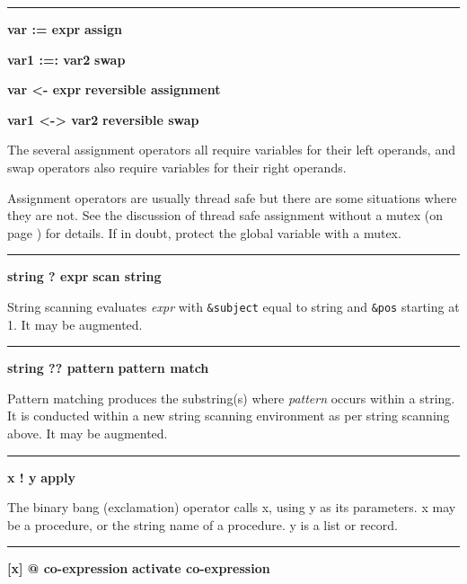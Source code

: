 \bigskip\hrule\vspace{0.1cm}

\noindent
{\bf var := expr } \hfill {\bf assign}

\noindent
{\bf var1 :=: var2 } \hfill {\bf swap}\WarningNotThreadSafe
{}

\noindent
{\bf var {\textless}- expr } \hfill {\bf reversible assignment}

\noindent
{\bf var1 {\textless}-{\textgreater} var2 } \hfill {\bf reversible swap}\WarningNotThreadSafe
{}

\noindent
The several assignment
operators all require variables for their left operands, and swap
operators also require variables for their right operands.

Assignment operators are usually thread safe \ConcurrencyIssue
but there are some situations where they are not. 
See the discussion of thread safe assignment without a mutex (on page
\pageref{ThreadSafeAssignment}) for details. If in doubt, protect the
global variable with a mutex.

\bigskip\hrule\vspace{0.1cm}
\noindent
{\bf string ? expr } \hfill {\bf scan string}

\noindent
{}String scanning evaluates \textit{expr}
with \texttt{\&subject} equal to string and \texttt{\&pos} starting at
1. It may be augmented.

\bigskip\hrule\vspace{0.1cm}
\noindent
{\bf string ?? pattern } \hfill {\bf pattern match}

\noindent
{}Pattern matching produces the substring(s) where
\textit{pattern} occurs within a string. It is conducted within a new
string scanning environment as per string scanning above. It may be augmented.

\bigskip\hrule\vspace{0.1cm}
\noindent
{\bf x ! y } \hfill {\bf apply}

\noindent
{}The binary bang (exclamation) operator calls x,
using y as its parameters.  x may be a procedure, or the string name of
a procedure.  y is a list or record.

\bigskip\hrule\vspace{0.1cm}
\noindent
{\bf [x] @ co-expression } \hfill {\bf activate co-expression}

